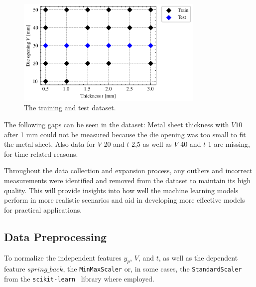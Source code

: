 {\begin{figure}[h]
    \begin{tcolorbox}[arc=0pt,boxrule=0.5pt]
        \centering
        \includegraphics[width=0.8\textwidth]{chap4/images/test_train_split}
    \end{tcolorbox}
    \caption{The training and test dataset.}
    \label{fig:train_test_split}
\end{figure}

The following gaps can be seen in the dataset: Metal sheet thickness with $V10$  after 1 mm could not be measured
because the die opening was too small to fit the metal sheet.
Also data for $V$ 20 and $t$ 2,5 as well as $V$ 40 and $t$ 1 are missing, for time related reasons.

Throughout the data collection and expansion process, any outliers and incorrect measurements were identified and
removed from the dataset to maintain its high quality.
This will provide insights into how well the machine learning models perform in more realistic scenarios and aid in
developing more effective models for practical applications.

\subsection{Data Preprocessing}\label{subsec:data-preprocessing}
To normalize the independent features $y_p$, $V$, and $t$, as well as the dependent feature $spring\_back$, the
\texttt{MinMaxScaler} or, in some cases, the \texttt{StandardScaler} from the
\texttt{scikit-learn}~\cite{scikit-learn} library where employed.

}
